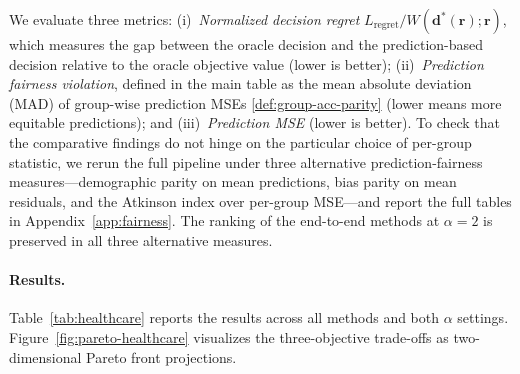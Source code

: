 \documentclass[ijoc,sglanonrev]{informs4}
\begin{document}
We evaluate three metrics: (i)~\textit{Normalized decision regret} $L_{\text{regret}} / W(\mathbf{d}^*(\mathbf{r});\mathbf{r})$, which measures the gap between the oracle decision and the prediction-based decision relative to the oracle objective value (lower is better); (ii)~\textit{Prediction fairness violation}, defined in the main table as the mean absolute deviation (MAD) of group-wise prediction MSEs \eqref{def:group-acc-parity} (lower means more equitable predictions); and (iii)~\textit{Prediction MSE} (lower is better). To check that the comparative findings do not hinge on the particular choice of per-group statistic, we rerun the full pipeline under three alternative prediction-fairness measures---demographic parity on mean predictions, bias parity on mean residuals, and the Atkinson index over per-group MSE---and report the full tables in Appendix~\ref{app:fairness}. The ranking of the end-to-end methods at $\alpha = 2$ is preserved in all three alternative measures.

\paragraph{Results.}
Table~\ref{tab:healthcare} reports the results across all methods and both $\alpha$ settings. Figure~\ref{fig:pareto-healthcare} visualizes the three-objective trade-offs as two-dimensional Pareto front projections.



\end{document}
